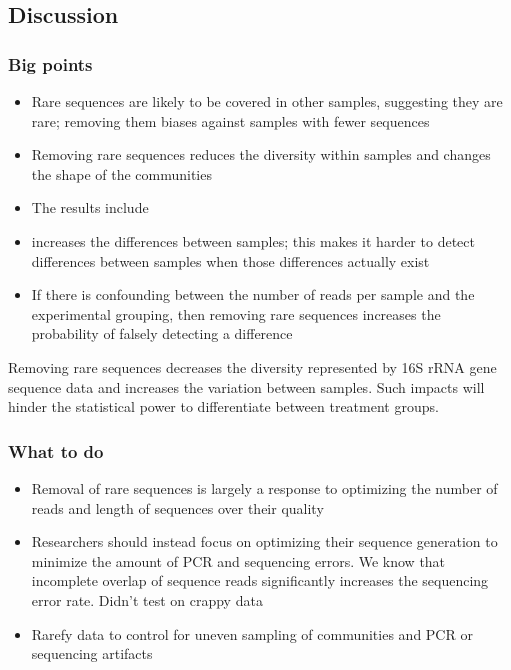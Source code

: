 \documentclass[]{article}
\begin{document}
\subsection{Discussion}\label{discussion}

\subsubsection{Big points}\label{big-points}

\begin{itemize}
\itemsep1pt\parskip0pt
\item
  Rare sequences are likely to be covered in other samples, suggesting
  they are rare; removing them biases against samples with fewer
  sequences
\item
  Removing rare sequences reduces the diversity within samples and
  changes the shape of the communities
\item
  The results include
\item
  increases the differences between samples; this makes it harder to
  detect differences between samples when those differences actually
  exist
\item
  If there is confounding between the number of reads per sample and the
  experimental grouping, then removing rare sequences increases the
  probability of falsely detecting a difference
\end{itemize}

Removing rare sequences decreases the diversity represented by 16S rRNA
gene sequence data and increases the variation between samples. Such
impacts will hinder the statistical power to differentiate between
treatment groups.

\subsubsection{What to do}\label{what-to-do}

\begin{itemize}
\itemsep1pt\parskip0pt
\item
  Removal of rare sequences is largely a response to optimizing the
  number of reads and length of sequences over their quality
\item
  Researchers should instead focus on optimizing their sequence
  generation to minimize the amount of PCR and sequencing errors. We
  know that incomplete overlap of sequence reads significantly increases
  the sequencing error rate. Didn't test on crappy data
\item
  Rarefy data to control for uneven sampling of communities and PCR or
  sequencing artifacts
\end{itemize}
\end{document}
